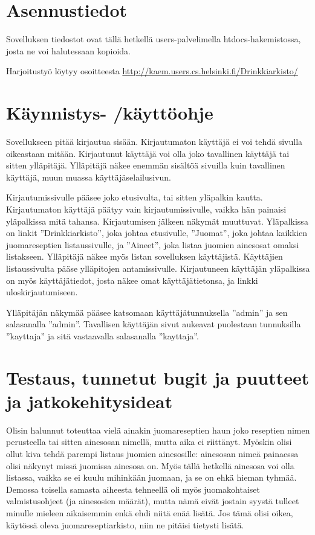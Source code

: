 \documentclass[a4paper]{article}
\begin{document}
\section{Asennustiedot}

Sovelluksen tiedostot ovat tällä hetkellä users-palvelimella htdocs-hakemistossa, josta ne voi halutessaan kopioida.

Harjoitustyö löytyy osoitteesta \url{http://kaem.users.cs.helsinki.fi/Drinkkiarkisto/}


\section{Käynnistys- /käyttöohje}

Sovellukseen pitää kirjautua sisään. Kirjautumaton käyttäjä ei voi tehdä sivulla oikeastaan mitään. Kirjautunut käyttäjä voi olla joko tavallinen käyttäjä tai sitten ylläpitäjä. Ylläpitäjä näkee enemmän sisältöä sivuilla kuin tavallinen käyttäjä, muun muassa käyttäjäselailusivun.

Kirjautumissivulle pääsee joko etusivulta, tai sitten yläpalkin kautta. Kirjautumaton käyttäjä päätyy vain kirjautumissivulle, vaikka hän painaisi yläpalkissa mitä tahansa. Kirjautumisen jälkeen näkymät muuttuvat. Yläpalkissa on linkit ”Drinkkiarkisto”, joka johtaa etusivulle, ”Juomat”, joka johtaa kaikkien juomareseptien listaussivulle, ja ”Aineet”, joka listaa juomien ainesosat omaksi listakseen. Ylläpitäjä näkee myös listan sovelluksen käyttäjistä. Käyttäjien listaussivulta pääse ylläpitojen antamissivulle. Kirjautuneen käyttäjän yläpalkissa on myös käyttäjätiedot, josta näkee omat käyttäjätietonsa, ja linkki uloskirjautumiseen.

Ylläpitäjän näkymää pääsee katsomaan käyttäjätunnuksella ”admin” ja sen salasanalla ”admin”. Tavallisen käyttäjän sivut aukeavat puolestaan tunnuksilla ”kayttaja” ja sitä vastaavalla salasanalla ”kayttaja”.

\section{Testaus, tunnetut bugit ja puutteet ja jatkokehitysideat}
Olisin halunnut toteuttaa vielä ainakin juomareseptien haun joko reseptien nimen perusteella tai sitten ainesosan nimellä, mutta aika ei riittänyt. Myöskin olisi ollut kiva tehdä parempi listaus juomien ainesosille: ainesosan nimeä painaessa olisi näkynyt missä juomissa ainesosa on. Myös tällä hetkellä ainesosa voi olla listassa, vaikka se ei kuulu mihinkään juomaan, ja se on ehkä hieman tyhmää. Demossa toisella samasta aiheesta tehneellä oli myös juomakohtaiset valmistusohjeet (ja ainesosien määrät), mutta nämä eivät jostain syystä tulleet minulle mieleen aikaisemmin enkä ehdi niitä enää lisätä. Jos tämä olisi oikea, käytössä oleva juomareseptiarkisto, niin ne pitäisi tietysti lisätä. 
\end{document}
